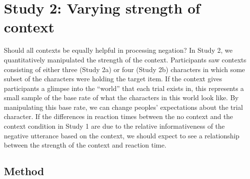 \documentclass[10pt,letterpaper]{article}
\begin{document}




\section{Study 2: Varying strength of context}

Should all contexts be equally helpful in processing negation? 
In Study 2, we quantitatively manipulated the strength of the context.  Participants saw contexts consisting of either three (Study 2a) or four (Study 2b) characters in which some subset of the characters were holding the target item.  If the context gives participants a glimpse into the ``world'' that each trial exists in, this represents a small sample of the base rate of what the characters in this world look like.  By manipulating this base rate, we can change peoples' expectations about the trial character.  If the differences in reaction times between the no context and the context condition in Study 1 are due to the relative informativeness of the negative utterance based on the context, we should expect to see a relationship between the strength of the context and reaction time. 

\subsection{Method}
\end{document}
